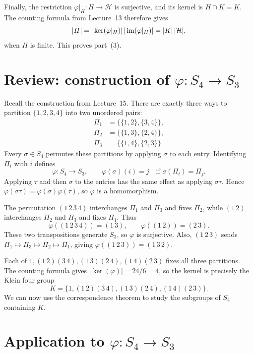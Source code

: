 \documentclass[reqno,11pt]{amsart}
\begin{document}
Finally, the restriction $\varphi|_H:H\to\mathcal H$ is surjective,
and its kernel is $H\cap K=K$. The counting formula from Lecture~13
therefore gives
\[
  |H|=|\ker(\varphi|_H)|\,|\operatorname{im}(\varphi|_H)|=|K|\,|\mathcal H|,
\]
when $H$ is finite. This proves part~(3).

\section{Review: construction of \texorpdfstring{$\varphi:S_4\to S_3$}{the map from S4 to S3}}

Recall the construction from Lecture~15. There are exactly three ways
to partition $\{1,2,3,4\}$ into two unordered pairs:
\[
\begin{aligned}
  \Pi_1&=\bigl\{\{1,2\},\{3,4\}\bigr\},\\
  \Pi_2&=\bigl\{\{1,3\},\{2,4\}\bigr\},\\
  \Pi_3&=\bigl\{\{1,4\},\{2,3\}\bigr\}.
\end{aligned}
\]
Every $\sigma\in S_4$ permutes these partitions by applying $\sigma$
to each entry. Identifying $\Pi_i$ with $i$ defines
\[
  \varphi:S_4\longrightarrow S_3,\qquad
  \varphi(\sigma)(i)=j\quad\text{if }\sigma(\Pi_i)=\Pi_j.
\]
Applying $\tau$ and then $\sigma$ to the entries has the same effect as
applying $\sigma\tau$. Hence
$\varphi(\sigma\tau)=\varphi(\sigma)\varphi(\tau)$, so $\varphi$ is a
homomorphism.

\begin{example}
The permutation $(1\,2\,3\,4)$ interchanges $\Pi_1$ and $\Pi_3$ and
fixes $\Pi_2$, while $(1\,2)$ interchanges $\Pi_2$ and $\Pi_3$ and
fixes $\Pi_1$. Thus
\[
  \varphi((1\,2\,3\,4))=(1\,3),\qquad
  \varphi((1\,2))=(2\,3).
\]
These two transpositions generate $S_3$, so $\varphi$ is surjective.
Also, $(1\,2\,3)$ sends
$\Pi_1\mapsto\Pi_3\mapsto\Pi_2\mapsto\Pi_1$, giving
$\varphi((1\,2\,3))=(1\,3\,2)$.
\end{example}

Each of $1,(1\,2)(3\,4),(1\,3)(2\,4),(1\,4)(2\,3)$ fixes all three
partitions. The counting formula gives $|\ker(\varphi)|=24/6=4$,
so the kernel is precisely the Klein four group
\[
  K=\{1,(1\,2)(3\,4),(1\,3)(2\,4),(1\,4)(2\,3)\}.
\]
We can now use the correspondence theorem to study the subgroups of
$S_4$ containing $K$.

\section{Application to \texorpdfstring{$\varphi:S_4\to S_3$}{the map from S4 to S3}}
\end{document}
